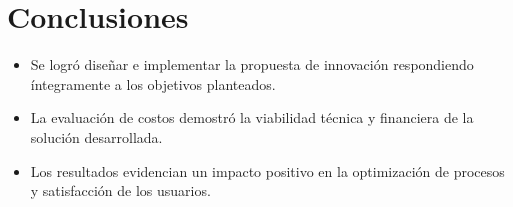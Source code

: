 \section{Conclusiones}
\label{sec:conclusiones}
\begin{itemize}
    \item Se logró diseñar e implementar la propuesta de innovación respondiendo íntegramente a los objetivos planteados.
    \item La evaluación de costos demostró la viabilidad técnica y financiera de la solución desarrollada.
    \item Los resultados evidencian un impacto positivo en la optimización de procesos y satisfacción de los usuarios.
\end{itemize}
